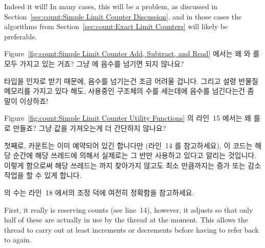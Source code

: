 \begin{enumerate}
	Indeed it will!
	In many cases, this will be a problem, as discussed in
	Section~\ref{sec:count:Simple Limit Counter Discussion}, and
	in those cases the algorithms from
	Section~\ref{sec:count:Exact Limit Counters}
	will likely be preferable.
	\fi

\QuickQ{}
	Figure~\ref{fig:count:Simple Limit Counter Add, Subtract, and Read}
	에서는 왜  와  를 모두 가지고 있는
	거죠?
	그냥  에 음수를 넘기면 되지 않나요?

\QuickA{}
	   타입을 인자로 받기 때문에,
	음수를 넘기는건 조금 어려울 겁니다.
	그리고 설령 반물질 메모리를 가지고 있다 해도, 사용중인 구조체의 수를
	세는데에 음수를 넘긴다는건 좀 말이 이상하죠!

\QuickQ{}
	Figure~\ref{fig:count:Simple Limit Counter Utility Functions} 의
	라인~15 에서는 왜  를   로 만들죠?
	그냥  값을 가져오는게 더 간단하지 않나요?

\QuickA{}
	첫째로,  카운트는 이미 예약되어 있긴 합니다만 (라인~14
	를 참고하세요), 이 코드는 해당 순간에 해당 쓰레드에 의해서 실제로는 그
	반만 사용하고 있다고 알리는 것입니다.
	이렇게 함으로써 해당 쓰레드는  까지 찾아가지 않고도
	최소  만큼까지는 증가 또는 감소 작업을 할 수 있게
	합니다.

	 의 수는 라인~18 에서의 조정 덕에 여전히 정확함을
	참고하세요.
	\iffalse

	First, it really is reserving  counts
	(see line~14), however,
	it adjusts so that only half of these are actually in use
	by the thread at the moment.
	This allows the thread to carry out at least 
	increments or decrements before having to refer back to
	 again.


\end{enumerate}
